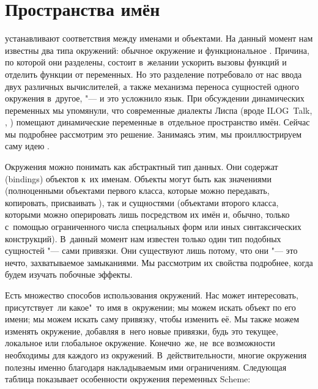 \section{Пространства имён}\label{lisp1-2-omega/sect:namespaces}

 устанавливают соответствия между именами и объектами. На данный
момент нам известны два типа окружений: обычное окружение  и
функциональное . Причина, по которой они разделены, состоит в~желании
ускорить вызовы функций и отделить функции от переменных. Но это разделение
потребовало от нас ввода двух различных вычислителей, а также механизма переноса
сущностей одного окружения в~другое, "--- и это усложнило язык. При обсуждении
динамических переменных мы упомянули, что современные диалекты Лиспа (вроде
ILOG~Talk, {\EuLisp}, {\ISLisp}) помещают динамические переменные в~отдельное
пространство имён. Сейчас мы подробнее рассмотрим это решение. Занимаясь этим,
мы проиллюстрируем саму идею .

\bigskip

Окружения можно понимать как абстрактный тип данных. Они содержат
 (bindings) объектов к~их именам. Объекты могут быть как
значениями (полноценными объектами первого класса, которые можно передавать,
копировать, присваивать {\itd}), так и сущностями (объектами второго класса,
которыми можно оперировать лишь посредством их имён и, обычно, только
с~помощью ограниченного числа специальных форм или иных синтаксических
конструкций). В~данный момент нам известен только один тип подобных сущностей
"--- сами привязки. Они существуют лишь потому, что они "--- это нечто,
захватываемое замыканиями. Мы рассмотрим их свойства подробнее, когда будем
изучать побочные эффекты.

Есть множество способов использования окружений. Нас может интересовать,
присутствует~ли какое"~то имя в~окружении; мы можем искать объект по его имени;
мы можем искать саму привязку, чтобы изменить её. Мы также можем изменять
окружение, добавляя в~него новые привязки, будь это текущее, локальное или
глобальное окружение. Конечно~же, не~все возможности необходимы для каждого
из окружений. В~действительности, многие окружения полезны именно благодаря
накладываемым ими ограничениям. Следующая таблица показывает особенности
окружения переменных Scheme:

